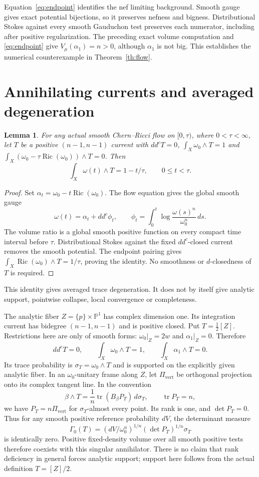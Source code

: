 \documentclass[11pt]{article}
\newcommand{\ddc}{dd^c}
\newtheorem{lemma}[theorem]{Lemma}
\theoremstyle{remark}\newtheorem{remark}[theorem]{Remark}
\begin{document}
Equation~\eqref{eq:endpoint} identifies the nef limiting background.
Smooth gauge gives exact potential bijections, so it preserves nefness
and bigness. Distributional Stokes against every smooth Gauduchon test
preserves each numerator, including after positive regularization.
The preceding exact volume computation and \eqref{eq:endpoint} give
$V_\mu(\alpha_1)=n>0$, although $\alpha_1$ is not big.
This establishes the numerical counterexample in Theorem~\ref{th:flow}.

\section{Annihilating currents and averaged degeneration}
\begin{lemma}\label{lem:averaged}
For any actual smooth Chern--Ricci flow on $[0,\tau)$, where
$0<\tau<\infty$, let $T$ be a positive $(n-1,n-1)$ current with
$\ddc T=0$, $\int_X\omega_0\wedge T=1$ and
$\int_X(\omega_0-\tau\operatorname{Ric}(\omega_0))\wedge T=0$.
Then
\[
 \int_X\omega(t)\wedge T=1-t/\tau,\qquad 0\leq t<\tau.
\]
\end{lemma}
\begin{proof}
Set $\alpha_t=\omega_0-t\operatorname{Ric}(\omega_0)$.
The flow equation gives the global smooth gauge
\[
 \omega(t)=\alpha_t+\ddc\phi_t,\qquad
 \phi_t=\int_0^t\log\frac{\omega(s)^n}{\omega_0^n}\,ds.
\]
The volume ratio is a global smooth positive function on every compact
time interval before $\tau$. Distributional Stokes against the fixed
$\ddc$-closed current removes the smooth potential. The endpoint pairing
gives $\int_X\operatorname{Ric}(\omega_0)\wedge T=1/\tau$, proving the
identity. No smoothness or $d$-closedness of $T$ is required.
\end{proof}
This identity gives averaged trace degeneration. It does not by itself
give analytic support, pointwise collapse, local convergence or completeness.

The analytic fiber $Z=\{p\}\times\mathbb P^1$ has complex dimension one.
Its integration current has bidegree $(n-1,n-1)$ and is positive closed.
Put $T=\frac12[Z]$. Restrictions here are only of smooth forms:
$\omega_0|_Z=2w$ and $\alpha_1|_Z=0$. Therefore
\[
 \ddc T=0,\qquad \int_X\omega_0\wedge T=1,
 \qquad \int_X\alpha_1\wedge T=0.
\]
Its trace probability is $\sigma_T=\omega_0\wedge T$ and is supported
on the explicitly given analytic fiber. In an $\omega_0$-unitary frame
along $Z$, let $\Pi_{\mathrm{vert}}$ be orthogonal projection onto its
complex tangent line. In the convention
\[
 \beta\wedge T=\frac1n\operatorname{tr}(B_\beta P_T)\,d\sigma_T,
 \qquad\operatorname{tr}P_T=n,
\]
we have $P_T=n\Pi_{\mathrm{vert}}$ for $\sigma_T$-almost every point.
Its rank is one, and $\det P_T=0$. Thus for any smooth positive reference
probability $dV$, the determinant measure
\[
 \Gamma_0(T)=(dV/\omega_0^n)^{1/n}(\det P_T)^{1/n}\sigma_T
\]
is identically zero. Positive fixed-density volume over all smooth
positive tests therefore coexists with this singular annihilator.
There is no claim that rank deficiency in general forces analytic support;
support here follows from the actual definition $T=[Z]/2$.
\end{document}
